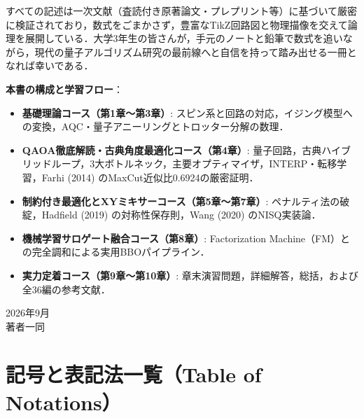 \documentclass[11pt,a4paper,oneside,openany]{ltjsbook}
\theoremstyle{definition}
\theoremstyle{plain}
\theoremstyle{remark}
\begin{document}
すべての記述は一次文献（査読付き原著論文・プレプリント等）に基づいて厳密に検証されており，数式をごまかさず，豊富なTikZ回路図と物理描像を交えて論理を展開している．大学3年生の皆さんが，手元のノートと鉛筆で数式を追いながら，現代の量子アルゴリズム研究の最前線へと自信を持って踏み出せる一冊となれば幸いである．

\vspace{5mm}
\noindent
\textbf{本書の構成と学習フロー}：
\begin{itemize}
    \item \textbf{基礎理論コース（第1章〜第3章）}: スピン系と回路の対応，イジング模型への変換，AQC・量子アニーリングとトロッター分解の数理．
    \item \textbf{QAOA徹底解読・古典角度最適化コース（第4章）}: 量子回路，古典ハイブリッドループ，3大ボトルネック，主要オプティマイザ，INTERP・転移学習，Farhi (2014) のMaxCut近似比0.6924の厳密証明．
    \item \textbf{制約付き最適化とXYミキサーコース（第5章〜第7章）}: ペナルティ法の破綻，Hadfield (2019) の対称性保存則，Wang (2020) のNISQ実装論．
    \item \textbf{機械学習サロゲート融合コース（第8章）}: Factorization Machine（FM）との完全調和による実用BBOパイプライン．
    \item \textbf{実力定着コース（第9章〜第10章）}: 章末演習問題，詳細解答，総括，および全36編の参考文献．
\end{itemize}

\vspace{5mm}
\begin{flushright}
2026年9月\\
著者一同
\end{flushright}

\newpage

\chapter*{記号と表記法一覧（Table of Notations）}
\end{document}

